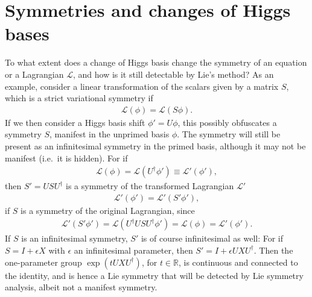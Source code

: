 \documentclass[a4paper,hidelinks, 12pt]{article}
\numberwithin{equation}{section}
\theoremstyle{plain}
\newcommand{\N}[1]{\mathbb{#1}}
\newcommand{\mc}{\mathcal}
\begin{document}
\section{Symmetries and changes of Higgs bases}
\label{sec:ChangesOfVariables}
To what extent does a change of Higgs basis change the symmetry of an equation or a Lagrangian $\mc{L}$, and how is it still detectable by Lie's method?
 As an example, consider a linear transformation of the scalars given by a matrix $S$, which is a strict variational symmetry if
\begin{align}
	\mc{L}(\phi)=\mc{L}(S\phi).
\end{align}
If we then consider a Higgs basis shift ${\phi}'=U\phi$, this possibly obfuscates a symmetry $S$, manifest in the unprimed basis $\phi$. The symmetry will still be present as an infinitesimal symmetry in the primed basis, although it may not be manifest (i.e.~it is hidden).  
For if 
\begin{align}
\mc{L}(\phi)=\mc{L}(U^\dag \phi')\equiv \mc{L}'(\phi'),	
\end{align}
then
$S'=USU^\dag $ is a symmetry of the transformed Lagrangian $\mc{L}'$ 
\begin{align}
	\mc{L}'(\phi')=\mc{L}'(S' \phi'),
\end{align}
if $S$ is a symmetry of the original Lagrangian, 
 since 
\begin{align}
	\mc{L}'(S' \phi')=\mc{L}(U^\dag US U^\dag \phi')=\mc{L}( {\phi})=\mc{L}'(\phi').
\end{align}
If $S$ is an infinitesimal symmetry, $S'$ is of course infinitesimal as well: 
For if $S=I+\epsilon X$ with $\epsilon$ an infinitesimal parameter, then $S'=I+\epsilon U X U^\dag$. Then the one-parameter group $\exp(t U X U^\dag)$, for $t\in \N{R}$, is continuous and connected to the identity, and is hence a Lie symmetry that will be detected by Lie symmetry analysis, albeit not a manifest symmetry.






\end{document}
